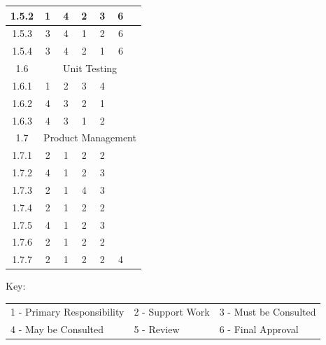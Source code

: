 \begin{longtable}{|c|c|c|c|c|c|c|}
	1.5.2  &1&4&2&3&6\\ \hline
	1.5.3  &3&4&1&2&6\\ \hline
	1.5.4  &3&4&2&1&6\\ \hline
	\hline 1.6 & \multicolumn{6}{c|}{Unit Testing} \\ \hline
	1.6.1  &1&2&3&4& \\ \hline
	1.6.2  &4&3&2&1& \\ \hline
	1.6.3  &4&3&1&2& \\ \hline
	\hline 1.7 & \multicolumn{6}{c|}{Product Management} \\ \hline
	1.7.1 &2&1&2&2&  \\ \hline
	1.7.2  &4&1&2&3&  \\ \hline
	1.7.3  &2&1&4&3&  \\ \hline
	1.7.4  &2&1&2&2&  \\ \hline
	1.7.5 &4&1&2&3&  \\ \hline
	1.7.6 &2&1&2&2&\\ \hline
	1.7.7 &2&1&2&2&4\\ \hline
\end{longtable}
Key:
\begin{tabular}{l l l}
	1 - Primary Responsibility & 2 - Support Work & 3 - Must be Consulted \\
	4 - May be Consulted & 5 - Review & 6 - Final Approval \\
\end{tabular}
